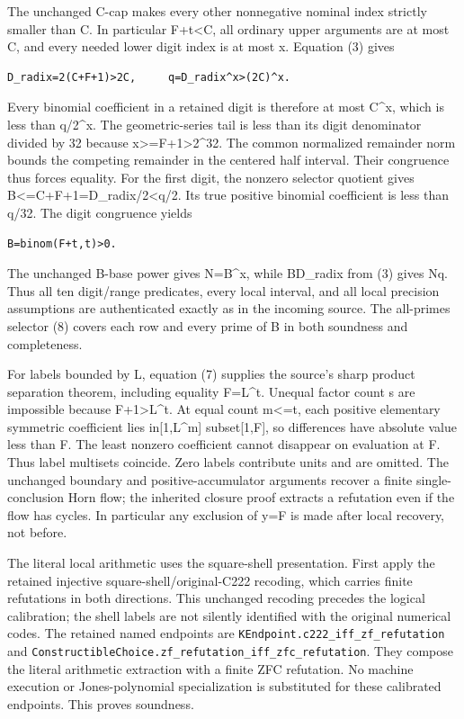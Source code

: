 The unchanged C-cap makes every other nonnegative nominal index strictly
smaller than C. In particular F+t\textless C, all ordinary upper
arguments are at most C, and every needed lower digit index is at most
x. Equation (3) gives

\begin{verbatim}
D_radix=2(C+F+1)>2C,     q=D_radix^x>(2C)^x.
\end{verbatim}

Every binomial coefficient in a retained digit is therefore at most
C\^{}x, which is less than q/2\^{}x. The geometric-series tail is less
than its digit denominator divided by 32 because
x\textgreater=F+1\textgreater2\^{}32. The common normalized remainder
norm bounds the competing remainder in the centered half interval. Their
congruence thus forces equality. For the first digit, the nonzero
selector quotient gives
\textbar B\textbar\textless=C+F+1=D\_radix/2\textless q/2. Its true
positive binomial coefficient is less than q/32. The digit congruence
yields

\begin{verbatim}
B=binom(F+t,t)>0.
\end{verbatim}

The unchanged B-base power gives N=B\^{}x, while B\textbar D\_radix from
(3) gives N\textbar q. Thus all ten digit/range predicates, every local
interval, and all local precision assumptions are authenticated exactly
as in the incoming source. The all-primes selector (8) covers each row
and every prime of B in both soundness and completeness.

For labels bounded by L, equation (7) supplies the source's sharp
product separation theorem, including equality F=L\^{}t. Unequal factor
count s are impossible because F+1\textgreater L\^{}t. At equal count
m\textless=t, each positive elementary symmetric coefficient lies
in{[}1,L\^{}m{]} subset{[}1,F{]}, so differences have absolute value
less than F. The least nonzero coefficient cannot disappear on
evaluation at F. Thus label multisets coincide. Zero labels contribute
units and are omitted. The unchanged boundary and positive-accumulator
arguments recover a finite single-conclusion Horn flow; the inherited
closure proof extracts a refutation even if the flow has cycles. In
particular any exclusion of y=F is made after local recovery, not
before.

The literal local arithmetic uses the square-shell presentation. First
apply the retained injective square-shell/original-C222 recoding, which
carries finite refutations in both directions. This unchanged recoding
precedes the logical calibration; the shell labels are not silently
identified with the original numerical codes. The retained named
endpoints are \nolinkurl{KEndpoint.c222_iff_zf_refutation} and
\nolinkurl{ConstructibleChoice.zf_refutation_iff_zfc_refutation}. They
compose the literal arithmetic extraction with a finite ZFC refutation.
No machine execution or Jones-polynomial specialization is substituted
for these calibrated endpoints. This proves soundness.

